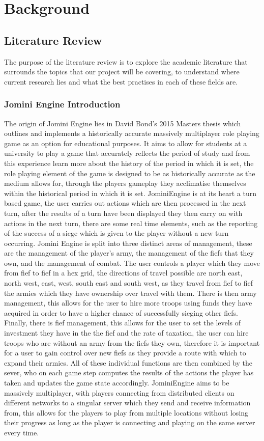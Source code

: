 \documentclass{article}
\begin{document}
	\section{Background}
	\subsection{Literature Review}
	The purpose of the literature review is to explore the academic literature that surrounds the topics that our project will be covering, to understand where current research lies and what the best practises in each of these fields are.
	\subsubsection{Jomini Engine Introduction}
	The origin of Jomini Engine lies in David Bond's 2015 Masters thesis\cite{DavidBond} which outlines and implements a historically accurate massively multiplayer role playing game as an option for educational purposes. It aims to allow for students at a university to play a game that accurately reflects the period of study and from this experience learn more about the history of the period in which it is set, the role playing element of the game is designed to be as historically accurate as the medium allows for,  through the players gameplay they acclimatise themselves within the historical period in which it is set. JominiEngine is at its heart a turn based game, the user carries out actions which are then processed in the next turn, after the results of a turn have been displayed they then carry on with actions in the next turn, there are some real time elements, such as the reporting of the success of a siege which is given to the player without a new turn occurring. Jomini Engine is split into three distinct areas of management, these are the management of the player's army, the management of the fiefs that they own, and the management of combat. The user controls a player which they move from fief to fief in a hex grid, the directions of travel possible are north east, north west, east, west, south east and south west, as they travel from fief to fief the armies which they have ownership over travel with them. There is then army management, this allows for the user to hire more troops using funds they have acquired in order to have a higher chance of successfully sieging other fiefs. Finally, there is fief management, this allows for the user to set the levels of investment they have in the the fief and the rate of taxation, the user can hire troops who are without an army from the fiefs they own, therefore it is important for a user to gain control over new fiefs as they provide a route with which to expand their armies. All of these individual functions are then combined by the sever, who on each game step computes the results of the actions the player has taken and updates the game state accordingly. JominiEngine aims to be massively multiplayer, with players connecting from distributed clients on different networks to a singular server which they send and receive information from, this allows for the players to play from multiple locations without losing their progress as long as the player is connecting and playing on the same server every time.
\end{document}
